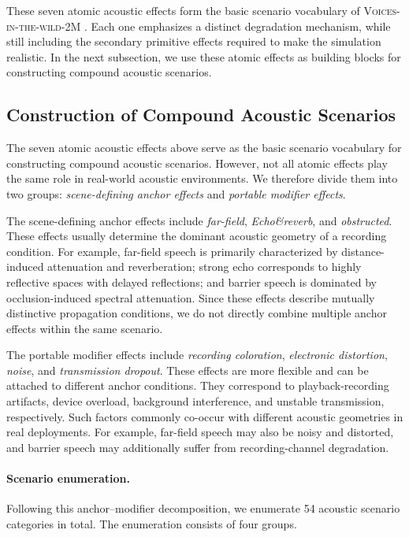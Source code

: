 \documentclass{llmxive}
\begin{document}
These seven atomic acoustic effects form the basic scenario vocabulary of
 \textsc{Voices-in-the-wild-2M} . Each one emphasizes a distinct degradation mechanism,
while still including the secondary primitive effects required to make the
simulation realistic. In the next subsection, we use these atomic effects as
building blocks for constructing compound acoustic scenarios.

\subsection{Construction of Compound Acoustic Scenarios}

The seven atomic acoustic effects above serve as the basic scenario vocabulary
for constructing compound acoustic scenarios. However, not all atomic effects
play the same role in real-world acoustic environments. We therefore divide
them into two groups: \textit{scene-defining anchor effects} and
\textit{portable modifier effects}.

The scene-defining anchor effects include \textit{far-field},
\textit{Echo\&reverb}, and \textit{obstructed}. These effects usually determine the
dominant acoustic geometry of a recording condition. For example, far-field
speech is primarily characterized by distance-induced attenuation and
reverberation; strong echo corresponds to highly reflective spaces with delayed
reflections; and barrier speech is dominated by occlusion-induced spectral
attenuation. Since these effects describe mutually distinctive propagation
conditions, we do not directly combine multiple anchor effects within the same
scenario.

The portable modifier effects include \textit{recording coloration},
\textit{electronic distortion}, \textit{noise}, and \textit{transmission
dropout}. These effects are more flexible and can be attached to different
anchor conditions. They correspond to playback-recording artifacts, device
overload, background interference, and unstable transmission, respectively.
Such factors commonly co-occur with different acoustic geometries in real
deployments. For example, far-field speech may also be noisy and distorted, and
barrier speech may additionally suffer from recording-channel degradation.

\paragraph{Scenario enumeration.}
Following this anchor--modifier decomposition, we enumerate 54 acoustic
scenario categories in total. The enumeration consists of four groups.
\end{document}
